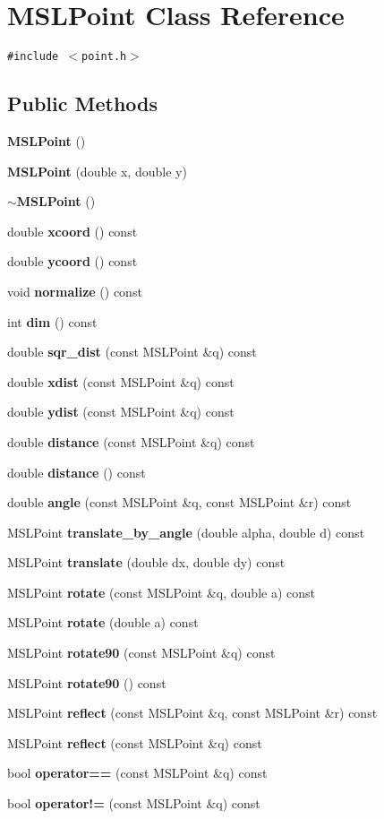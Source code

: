 \section{MSLPoint  Class Reference}
\label{classMSLPoint}
{\tt \#include $<$point.h$>$}

\subsection*{Public Methods}
\begin{CompactItemize}
\item 
{\bf MSLPoint} ()
\item 
{\bf MSLPoint} (double x, double y)
\item 
{\bf $\sim$MSLPoint} ()
\item 
double {\bf xcoord} () const
\item 
double {\bf ycoord} () const
\item 
void {\bf normalize} () const
\item 
int {\bf dim} () const
\item 
double {\bf sqr\_\-dist} (const MSLPoint \&q) const
\item 
double {\bf xdist} (const MSLPoint \&q) const
\item 
double {\bf ydist} (const MSLPoint \&q) const
\item 
double {\bf distance} (const MSLPoint \&q) const
\item 
double {\bf distance} () const
\item 
double {\bf angle} (const MSLPoint \&q, const MSLPoint \&r) const
\item 
MSLPoint {\bf translate\_\-by\_\-angle} (double alpha, double d) const
\item 
MSLPoint {\bf translate} (double dx, double dy) const
\item 
MSLPoint {\bf rotate} (const MSLPoint \&q, double a) const
\item 
MSLPoint {\bf rotate} (double a) const
\item 
MSLPoint {\bf rotate90} (const MSLPoint \&q) const
\item 
MSLPoint {\bf rotate90} () const
\item 
MSLPoint {\bf reflect} (const MSLPoint \&q, const MSLPoint \&r) const
\item 
MSLPoint {\bf reflect} (const MSLPoint \&q) const
\item 
bool {\bf operator==} (const MSLPoint \&q) const
\item 
bool {\bf operator!=} (const MSLPoint \&q) const
\end{CompactItemize}
